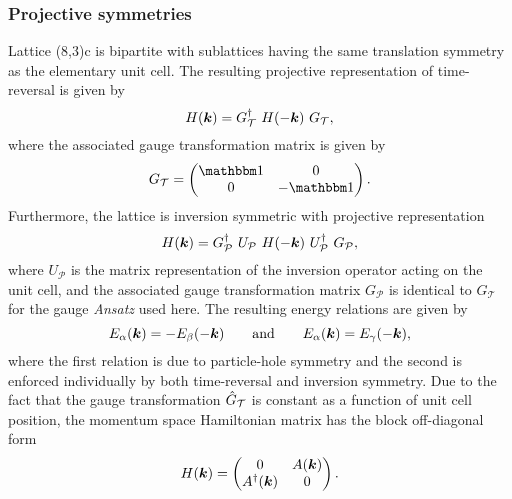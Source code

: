 \subsubsection{Projective symmetries}
%
%
Lattice (8,3)c is bipartite with sublattices having the same translation symmetry as the elementary unit cell.
The resulting projective representation of time-reversal is given by
%
\begin{equation}
	H(\bm{k}) = G^{\dagger}_{\mathcal{T}}~H(-\bm{k})~G_{\mathcal{T}},
\end{equation}
%
where the associated gauge transformation matrix is given by
%
\begin{equation}
	G_{\mathcal{T}} =
		\begin{pmatrix}
			\id & 0 \\
			0	& -\id
		\end{pmatrix}.
\end{equation}
%
Furthermore, the lattice is inversion symmetric with projective representation
%
\begin{equation}
	H(\bm{k}) = G^{\dagger}_{\mathcal{P}}~U_{\mathcal{P}}~H(-\bm{k})~U^{\dagger}_{\mathcal{P}}~G_{\mathcal{P}},
\end{equation}
%
where $U_{\mathcal{P}}$ is the matrix representation of the inversion operator acting on the unit cell, and the associated gauge transformation matrix $G_{\mathcal{P}}$ is identical to $G_{\mathcal{T}}$ for the gauge \textit{Ansatz} used here.
The resulting energy relations are given by
%
\begin{equation}
	E_{\alpha}(\bm{k}) = -E_{\beta}(-\bm{k}) \qquad {\rm and } \qquad E_{\alpha}(\bm{k}) = E_{\gamma}(-\bm{k}),
\end{equation}
%
where the first relation is due to particle-hole symmetry and the second is enforced individually by both time-reversal and inversion symmetry.
Due to the fact that the gauge transformation $\hat{G}_{\mathcal{T}}$ is constant as a function of unit cell position,
the momentum space Hamiltonian matrix has the block off-diagonal form
%
\begin{equation}
	H(\bm{k}) =
		\begin{pmatrix}
			0			& A(\bm{k}) \\
			A^{\dagger}(\bm{k})	& 0
		\end{pmatrix}.
		\label{eq:chapter05_8_3cGenericHamiltonian}
\end{equation}
%


%
%
